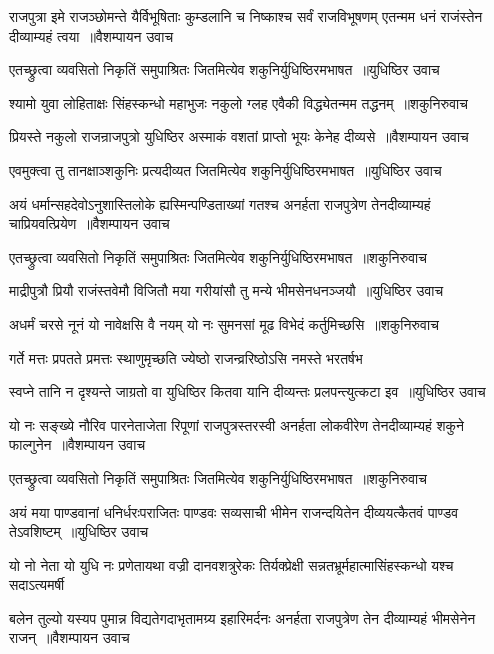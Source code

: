 \threelineshloka
{राजपुत्रा इमे राजञ्छोमन्ते यैर्विभूषिताः}
{कुम्डलानि च निष्काश्च सर्वं राजविभूषणम्}
{एतन्मम धनं राजंस्तेन दीव्याम्यहं त्वया ॥वैशम्पायन उवाच}


\twolineshloka
{एतच्छ्रुत्वा व्यवसितो निकृतिं समुपाश्रितः}
{जितमित्येव शकुनिर्युधिष्ठिरमभाषत ॥युधिष्ठिर उवाच}


\threelineshloka
{श्यामो युवा लोहिताक्षः सिंहस्कन्धो महाभुजः}
{नकुलो ग्लह एवैकी विद्ध्येतन्मम तद्धनम् ॥शकुनिरुवाच}
{}


\twolineshloka
{प्रियस्ते नकुलो राजन्राजपुत्रो युधिष्ठिर}
{अस्माकं वशतां प्राप्तो भूयः केनेह दीव्यसे ॥वैशम्पायन उवाच}


\twolineshloka
{एवमुक्त्वा तु तानक्षाञ्शकुनिः प्रत्यदीव्यत}
{जितमित्येव शकुनिर्युधिष्ठिरमभाषत ॥युधिष्ठिर उवाच}


\twolineshloka
{अयं धर्मान्सहदेवोऽनुशास्तिलोके ह्यस्मिन्पण्डिताख्यां गतश्च}
{अनर्हता राजपुत्रेण तेनदीव्याम्यहं चाप्रियवत्प्रियेण ॥वैशम्पायन उवाच}


\twolineshloka
{एतच्छ्रुत्वा व्यवसितो निकृतिं समुपाश्रितः}
{जितमित्येव शकुनिर्युधिष्ठिरमभाषत ॥शकुनिरुवाच}


\threelineshloka
{माद्रीपुत्रौ प्रियौ राजंस्तवेमौ विजितौ मया}
{गरीयांसौ तु मन्ये भीमसेनधनञ्जयौ ॥युधिष्ठिर उवाच}
{}


\twolineshloka
{अधर्मं चरसे नूनं यो नावेक्षसि वै नयम्}
{यो नः सुमनसां मूढ विभेदं कर्तुमिच्छसि ॥शकुनिरुवाच}


\twolineshloka
{गर्ते मत्तः प्रपतते प्रमत्तः स्थाणुमृच्छति}
{ज्येष्ठो राजन्व्ररिष्ठोऽसि नमस्ते भरतर्षभ}


\twolineshloka
{स्वप्ने तानि न दृश्यन्ते जाग्रतो वा युधिष्ठिर}
{कितवा यानि दीव्यन्तः प्रलपन्त्युत्कटा इव ॥युधिष्ठिर उवाच}


\twolineshloka
{यो नः सङ्ख्ये नौरिव पारनेताजेता रिपूणां राजपुत्रस्तरस्वी}
{अनर्हता लोकवीरेण तेनदीव्याम्यहं शकुने फाल्गुनेन ॥वैशम्पायन उवाच}


\threelineshloka
{एतच्छ्रुत्वा व्यवसितो निकृतिं समुपाश्रितः}
{जितमित्येव शकुनिर्युधिष्ठिरमभाषत ॥शकुनिरुवाच}
{}


\twolineshloka
{अयं मया पाण्डवानां धनिर्धरःपराजितः पाण्डवः सव्यसाची}
{भीमेन राजन्दयितेन दीव्ययत्कैतवं पाण्डव तेऽवशिष्टम् ॥युधिष्ठिर उवाच}


\twolineshloka
{यो नो नेता यो युधि नः प्रणेतायथा वज्री दानवशत्रुरेकः}
{तिर्यक्प्रेक्षी सन्नतभ्रूर्महात्मासिंहस्कन्धो यश्च सदाऽत्यमर्षी}


\twolineshloka
{बलेन तुल्यो यस्यप पुमान्न विद्यतेगदाभृतामग्र्य इहारिमर्दनः}
{अनर्हता राजपुत्रेण तेन दीव्याम्यहं भीमसेनेन राजन् ॥वैशम्पायन उवाच}


